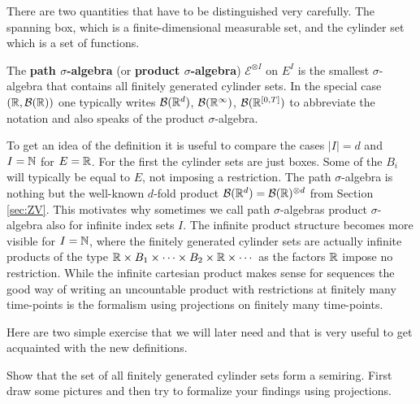 	There are two quantities that have to be distinguished very carefully. The spanning box, which is a finite-dimensional measurable set, and the cylinder set which is a set of functions. 
\begin{ldef}
\begin{deff}
		 The \textbf{path $\sigma$-algebra} (or \textbf{product $\sigma$-algebra}) $\mathcal E^{\otimes I}$ on $E^I$ is the smallest $\sigma$-algebra that contains all finitely generated cylinder sets.
		In the special case $(\mathbb{R},\mathcal B(\mathbb{R}))$ one typically writes $\mathcal B(\mathbb{R}^d)$, $\mathcal B(\mathbb{R}^\infty)$, $\mathcal B(\mathbb{R}^{[0,T]})$ to abbreviate the notation and also speaks of the product $\sigma$-algebra.
	\end{deff}
\end{ldef}
To get an idea of the definition it is useful to compare the cases $|I|=d$ and $I=\mathbb{N}$ for $E=\mathbb{R}$. For the first the cylinder sets are just boxes. Some of the $B_i$ will typically be equal to $E$, not imposing a restriction. The path $\sigma$-algebra is nothing but the well-known $d$-fold product $\mathcal B(\mathbb{R}^d)=\mathcal B(\mathbb{R})^{\otimes d}$ from Section \ref{sec:ZV}. This motivates why sometimes we call path $\sigma$-algebras product $\sigma$-algebra also for infinite index sets $I$. The infinite product structure becomes more visible for $I=\mathbb{N}$, where the finitely generated cylinder sets are actually infinite products of the type $\mathbb{R}\times B_1 \times \cdots \times B_2\times \mathbb{R} \times \cdots$ as the factors $\mathbb{R}$ impose no restriction. While the infinite cartesian product makes sense for sequences the good way of writing an uncountable product with restrictions at finitely many time-points is the formalism using projections on finitely many time-points.\smallskip


Here are two simple exercise that we will later need and that is very useful to get acquainted with the new definitions.
\begin{luebung}
	Show that the set of all finitely generated cylinder sets form a semiring. First draw some pictures and then try to formalize your findings using projections.
\end{luebung}



